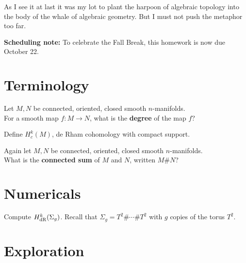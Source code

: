 \documentclass{homework}
\author{Jim Fowler}
\begin{document}
\maketitle

\begin{inspiration} As I see it at last it was my lot to plant the
harpoon of algebraic topology into the body of the whale of algebraic
geometry. But I must not push the metaphor too far.  
\end{inspiration}

\textbf{Scheduling note:} To celebrate the Fall Break, this homework is now due October 22. 

\section{Terminology}

\begin{problem} Let $M, N$ be connected, oriented, closed smooth
$n$-manifolds. \\ For a smooth map $f : M \to N$, what is the
\textbf{degree} of the map $f$?
\end{problem}

\begin{problem}
 Define $H_c^k(M)$, de Rham cohomology with compact support. 
\end{problem}

\begin{problem}
  Again let $M, N$ be connected, oriented, closed smooth $n$-manifolds.\\  What is the \textbf{connected sum} of $M$ and $N$, written $M \# N$?
\end{problem}

\section{Numericals}

\begin{problem}
Compute $H_{\operatorname{dR}}^k(\Sigma_g)$.  Recall that $\Sigma_g = T^2 \# \cdots \# T^2$ with $g$ copies of the torus $T^2$.
\end{problem}

\section{Exploration}
\end{document}

